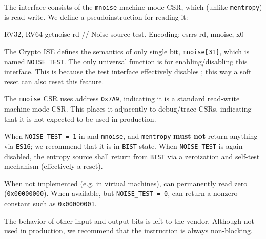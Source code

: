    The interface consists of the {\tt mnoise} machine-mode CSR, which
    (unlike {\tt mentropy}) is read-write. We define a
    pseudoinstruction for reading it:
\begin{cryptoisa}
RV32, RV64
    getnoise    rd   // Noise source test. Encoding: csrrs rd, mnoise, x0
\end{cryptoisa}

    The Crypto ISE defines the semantics of only single bit,
    \verb|mnoise[31]|, which is named \verb|NOISE_TEST|. The only
    universal function is for enabling/disabling this interface. This is
    because the test interface effectively disables ;
    this way a soft reset can also reset this feature.

    The {\tt mnoise} CSR uses address {\tt 0x7A9}, indicating it is a
    standard read-write machine-mode CSR.
    This places it adjacently to debug/trace CSRs, indicating that
    it is not expected to be used in production.

    When \verb|NOISE_TEST = 1| in  and {\tt mnoise},
     and {\tt mentropy} {\bf must not} return
    anything via \verb|ES16|; we recommend
    that it is in \verb|BIST| state. When \verb|NOISE_TEST| is
    again disabled, the entropy source shall return from \verb|BIST|
    via a zeroization and self-test mechanism (effectively a reset).

    When not implemented (e.g. in virtual machines), 
    can permanently read zero (\verb|0x00000000|). When available, but
    \verb|NOISE_TEST = 0|,  can return a nonzero
    constant such as \verb|0x00000001|.

    The behavior of other input and output bits is left to the vendor.
    Although not used in production, we recommend that the instruction
    is always non-blocking.

